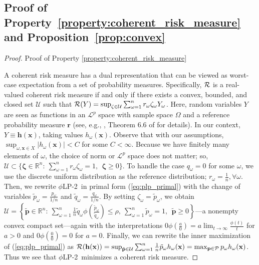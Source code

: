 \documentclass[opre,nonblindrev]{informs3} %
\newcommand{\x}{\mathbf{x}}
\renewcommand{\h}{\mathbf{h}}
\newcommand{\p}{\mathbf{p}}
\newcommand{\plp}{$\phi$LP-2}
\begin{document}
%
 \begin{APPENDICES}

	\section{Proof of Property~\ref{property:coherent_risk_measure} and Proposition~\ref{prop:convex}}
	\label{sec:apx_proof} 


\begin{proof}{\sc Proof of Property \ref{property:coherent_risk_measure}}
	
A coherent risk measure has a dual representation that can be viewed as worst-case expectation from a set of probability measures. 
	Specifically, $\cal R$ is a real-valued coherent risk measure if and only if there exists a convex, bounded, and closed set $\mathcal{U}$ such that ${\cal R}(Y)=\sup_{\mathbf{\zeta} \in \mathcal{U}}\sum_{\omega=1}^n r_\omega \zeta_\omega Y_\omega$. 
	Here, random variables $Y$ are seen as functions in an $\mathcal{L}^p$ space with sample space $\Omega$ and a reference probability measure $\mathbf{r}$ (see, e.g., \cite{rockafellar2007coherent}, Theorem 6.6 of \cite{shaDR:09} for details). 
	In our context, $Y \equiv \h(\x)$, taking values $h_\omega(\x)$. 
	Observe that with our assumptions, $\sup_{\omega, \x \in X} |h_\omega(\x)|<C$ for some $C<\infty$. 
		Because we have finitely many elements of $\omega$, the choice of norm or $\mathcal{L}^p$ space does not matter; so, $\mathcal{U} \subset \{\mathbf{\zeta} \in \mathbb{R}^n\colon\ \sum_{\omega=1}^{n} r_\omega \zeta_\omega = 1, \ \  \mathbf{\zeta} \geq 0 \}$.
	To handle the case $q_\omega=0$ for some $\omega$, we use the discrete uniform distribution as the reference distribution;  $r_\omega = \frac{1}{n}, \forall \omega$. 
	Then, we rewrite  \plp\ in primal form (\ref{eq:plp_primal}) with the change of variables $\tilde{p}_\omega = \frac{p_\omega}{1/n}$ and $\tilde{q}_\omega = \frac{q_\omega}{1/n}$. 
	By setting $\zeta_\omega = \tilde{p}_\omega$, we obtain $\mathcal{U}=\left\{ \tilde{\p}\in \mathbb{R}^n\colon \  \sum_{\omega=1}^{n} \frac{1}{n}\tilde{q}_\omega \phi\left( \frac{\tilde{p}_\omega}{\tilde{q}_\omega} \right) \leq \rho, \  \sum_{\omega=1}^{n}\tilde{p}_\omega =1, \ \ \tilde{\p} \geq 0 \right\}$---a nonempty convex compact set---again with the interpretations $0\phi\left(\frac{a}{0}\right)=a\lim_{t\rightarrow \infty}\frac{\phi(t)}{t}$ for $a>0$ and $0\phi\left(\frac{0}{0}\right)=0$ for $a=0$.
	Finally, we can rewrite the inner maximization of (\ref{eq:plp_primal}) as ${\cal R}(\h(\x))=\sup_{\tilde{\p} \in \mathcal{U}}\sum_{\omega=1}^n \frac{1}{n} \tilde{p}_\omega h_\omega(\x) =\max_{\p \in {\mathcal{P}}} p_\omega h_\omega(\x)$. 
	Thus we see that \plp\ minimizes a coherent risk measure.
	\Halmos
\end{proof}


\end{APPENDICES}
\end{document}
